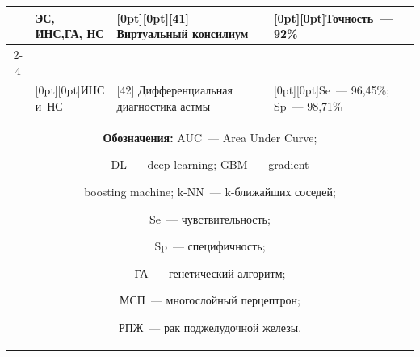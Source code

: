 \begin{table}
{\begin{sideways}
\begin{tabular}{|c|p{22mm}|p{58mm}|p{65mm}|}
&ЭС, ИНС,\newline ГА, НС&

\multicolumn{1}{l|}{\raisebox{-4pt}[0pt][0pt]{[41] Виртуальный консилиум}}&\multicolumn{1}{l|}{\raisebox{-4pt}[0pt][0pt]{Точность~--- 92\%}}\\

\cline{2-4}

&&&\\[-8pt]

&\multicolumn{1}{l|}{\raisebox{-4pt}[0pt][0pt]{ИНС и~НС}}&[42] Дифференциальная диагностика астмы &\multicolumn{1}{l|}{\raisebox{-4pt}[0pt][0pt]{Se~--- 96,45\%; Sp~--- 98,71\%}}\\

\hline

\multicolumn{4}{p{170mm}}{\footnotesize \hspace*{2mm} \textbf{Обозначения:} AUC~--- Area Under Curve; 

DL~--- deep learning; GBM~--- gradient 

boosting machine; k-NN~--- k-бли\-жай\-ших соседей;  


Se~--- чувствительность; 


Sp~--- специфичность; 

ГА~--- генетический алгоритм;



МСП~--- многослойный перцептрон; %

РПЖ~--- рак поджелудочной железы.



}

\end{tabular}

\end{sideways}

}

\end{table}



